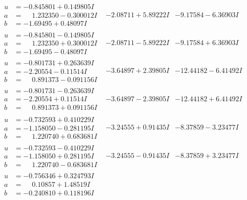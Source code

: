 \documentclass[1p]{elsarticle_modified}
\theoremstyle{definition}
\begin{document}
$$\begin{array}{c|c|c}
 \hline 
\begin{aligned}
u &= -0.845801 + 0.149805 I \\
a &= \phantom{-}1.232350 - 0.300012 I \\
b &= -1.69495 + 0.48097 I\end{aligned}
 & -2.08711 + 5.89222 I & -9.17584 - 6.36903 I \\ \hline\begin{aligned}
u &= -0.845801 - 0.149805 I \\
a &= \phantom{-}1.232350 + 0.300012 I \\
b &= -1.69495 - 0.48097 I\end{aligned}
 & -2.08711 - 5.89222 I & -9.17584 + 6.36903 I \\ \hline\begin{aligned}
u &= -0.801731 + 0.263639 I \\
a &= -2.20554 - 0.11514 I \\
b &= \phantom{-}0.891373 - 0.091156 I\end{aligned}
 & -3.64897 + 2.39805 I & -12.44182 - 6.41492 I \\ \hline\begin{aligned}
u &= -0.801731 - 0.263639 I \\
a &= -2.20554 + 0.11514 I \\
b &= \phantom{-}0.891373 + 0.091156 I\end{aligned}
 & -3.64897 - 2.39805 I & -12.44182 + 6.41492 I \\ \hline\begin{aligned}
u &= -0.732593 + 0.410229 I \\
a &= -1.158050 - 0.281195 I \\
b &= \phantom{-}1.220740 + 0.683681 I\end{aligned}
 & -3.24555 + 0.91435 I & -8.37859 - 3.23477 I \\ \hline\begin{aligned}
u &= -0.732593 - 0.410229 I \\
a &= -1.158050 + 0.281195 I \\
b &= \phantom{-}1.220740 - 0.683681 I\end{aligned}
 & -3.24555 - 0.91435 I & -8.37859 + 3.23477 I \\ \hline\begin{aligned}
u &= -0.756346 + 0.324793 I \\
a &= \phantom{-}0.10857 + 1.48519 I \\
b &= -0.240810 + 0.118196 I\end{aligned}

\end{array}$$
\end{document}
